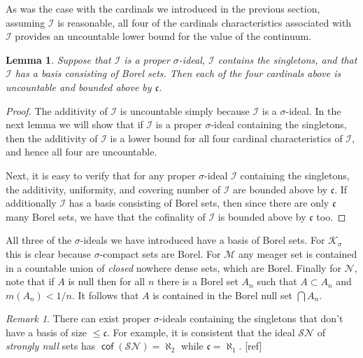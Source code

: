 \documentclass[11pt,oneside]{amsbook}
\newcommand{\Null}{\mathcal N}
\newcommand{\Meager}{\mathcal M}
\newcommand{\Ksigma}{\mathcal K_\sigma}
\DeclareMathOperator{\cof}{\mathsf{cof}}
\theoremstyle{definition}
\theoremstyle{plain}
\newtheorem{lemma}[theorem]{Lemma}
\theoremstyle{definition}
\theoremstyle{remark}
\newtheorem{remark}[theorem]{Remark}
\numberwithin{equation}{section}
\numberwithin{figure}{section}
\begin{document}
As was the case with the cardinals we introduced in the previous section, assuming $\mathcal I$ is reasonable, all four of the cardinals characteristics associated with $\mathcal I$ provides an uncountable lower bound for the value of the continuum.

\begin{lemma}
  \label{lem:ideal-cards}
  Suppose that $\mathcal I$ is a proper $\sigma$-ideal, $\mathcal I$ contains the singletons, and that $\mathcal I$ has a basis consisting of Borel sets. Then each of the four cardinals above is uncountable and bounded above by $\mathfrak c$.
\end{lemma}

\begin{proof}
  The additivity of $\mathcal I$ is uncountable simply because $\mathcal I$ is a $\sigma$-ideal. In the next lemma we will show that if $\mathcal I$ is a proper $\sigma$-ideal containing the singletons, then the additivity of $\mathcal I$ is a lower bound for all four cardinal characteristics of $\mathcal I$, and hence all four are uncountable.

  Next, it is easy to verify that for any proper $\sigma$-ideal $\mathcal I$ containing the singletons, the additivity, uniformity, and covering number of $\mathcal I$ are bounded above by $\mathfrak c$. If additionally $\mathcal I$ has a basis consisting of Borel sets, then since there are only $\mathfrak c$ many Borel sets, we have that the cofinality of $\mathcal I$ is bounded above by $\mathfrak c$ too.
\end{proof}

All three of the $\sigma$-ideals we have introduced have a basis of Borel sets. For $\Ksigma$ this is clear because $\sigma$-compact sets are Borel. For $\Meager$ any meager set is contained in a countable union of \emph{closed} nowhere dense sets, which are Borel. Finally for $\Null$, note that if $A$ is null then for all $n$ there is a Borel set $A_n$ such that $A\subset A_n$ and $m(A_n)<1/n$. It follows that $A$ is contained in the Borel null set $\bigcap A_n$.

\begin{remark}
  There can exist proper $\sigma$-ideals containing the singletons that don't have a basis of size $\leq\mathfrak c$. For example, it is consistent that the ideal $\mathcal{SN}$ of \emph{strongly null} sets has $\cof(\mathcal{SN})=\aleph_2$ while $\mathfrak c=\aleph_1$.
  [ref] %
\end{remark}
\end{document}
